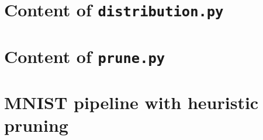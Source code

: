 \begin{appendices}

\chapter{Content of \texttt{distribution.py}}\label{appendix:distribution.py}


\chapter{Content of \texttt{prune.py}}\label{appendix:prune.py}


\chapter{MNIST pipeline with heuristic pruning}\label{appendix:mnist}


\end{appendices}
